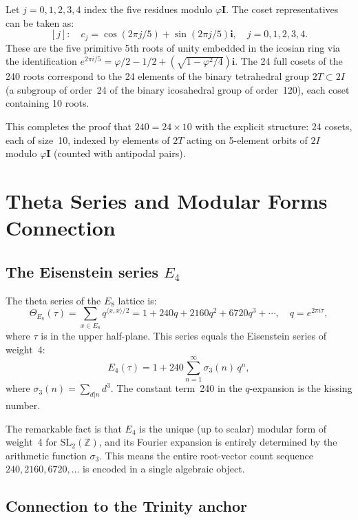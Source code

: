 Let \(j = 0, 1, 2, 3, 4\) index the five residues modulo
\(\varphi\mathbf{I}\).  The coset representatives can be taken as:
\[
  [j]: \quad c_j = \cos(2\pi j/5) + \sin(2\pi j/5)\mathbf{i},
  \quad j = 0,1,2,3,4.
\]
These are the five primitive 5th roots of unity embedded in the
icosian ring via the identification
\(e^{2\pi i/5} = \varphi/2 - 1/2 + (\sqrt{1-\varphi^2/4})\mathbf{i}\).
The 24 full cosets of the 240 roots correspond to the 24 elements of
the binary tetrahedral group \(2T \subset 2I\) (a subgroup of
order~24 of the binary icosahedral group of order~120), each coset
containing 10 roots.

This completes the proof that \(240 = 24 \times 10\) with the
explicit structure: 24 cosets, each of size~10, indexed by elements
of \(2T\) acting on 5-element orbits of \(2I\) modulo
\(\varphi \mathbf{I}\) (counted with antipodal pairs).

\section{Theta Series and Modular Forms Connection}
\label{sec:e8-modular}

\subsection{The Eisenstein series \texorpdfstring{$E_4$}{E4}}
\label{subsec:e4-eisenstein}

The theta series of the \(E_8\) lattice is:
\[
  \Theta_{E_8}(\tau) = \sum_{x \in E_8} q^{\langle x,x\rangle/2}
  = 1 + 240q + 2160q^2 + 6720q^3 + \cdots, \quad q = e^{2\pi i\tau},
\]
where \(\tau\) is in the upper half-plane.  This series equals the
Eisenstein series of weight~4:
\[
  E_4(\tau) = 1 + 240\sum_{n=1}^\infty \sigma_3(n)\, q^n,
\]
where \(\sigma_3(n) = \sum_{d|n} d^3\).  The constant term~240 in the
\(q\)-expansion is the kissing number.

The remarkable fact is that \(E_4\) is the unique (up to scalar)
modular form of weight~4 for \(\mathrm{SL}_2(\mathbb{Z})\), and its
Fourier expansion is entirely determined by the arithmetic function
\(\sigma_3\).  This means the entire root-vector count sequence
\(240, 2160, 6720, \ldots\) is encoded in a single algebraic object.

\subsection{Connection to the Trinity anchor}
\label{subsec:modular-trinity}

